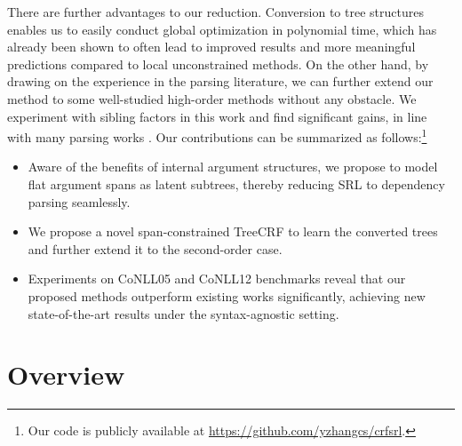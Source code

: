 \documentclass[11pt]{article}
\begin{document}
There are further advantages to our reduction.
Conversion to tree structures enables us to easily conduct global optimization \cite{eisner-1996-three,mcdonald-etal-2005-online} in polynomial time, which has already been shown to often lead to improved results and more meaningful predictions \cite{toutanova-etal-2008-global, tackstrom-etal-2015-efficient,fitzgerald-etal-2015-semantic,li-etal-2020-structured} compared to local unconstrained methods.
On the other hand, by drawing on the experience in the parsing literature, we can further extend our method to some well-studied high-order methods \cite{mcdonald-pereira-2006-online} without any obstacle.
We experiment with sibling factors in this work and find significant gains, in line with many parsing works \cite{zhang-etal-2020-efficient,fonseca-martins-2020-revisiting}.
Our contributions can be summarized as follows:\footnote{Our code is publicly available at \url{https://github.com/yzhangcs/crfsrl}.}
\begin{itemize}[leftmargin=11pt]
    \item Aware of the benefits of internal argument structures, we propose to model flat argument spans as latent subtrees, thereby reducing SRL to dependency parsing seamlessly.
    \item We propose a novel span-constrained TreeCRF to learn the converted trees and further extend it to the second-order case.
    \item Experiments on CoNLL05 and CoNLL12 benchmarks reveal that our proposed methods outperform existing works significantly, achieving new state-of-the-art results under the syntax-agnostic setting.
\end{itemize}


















\section{Overview}\label{sec:srl-as-dep}
\end{document}
